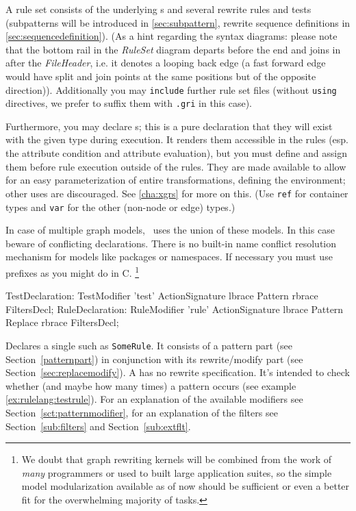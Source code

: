A rule set consists of the underlying s and several rewrite rules and tests (subpatterns will be introduced in \ref{sec:subpattern}, rewrite sequence definitions in \ref{sec:sequencedefinition}).
(As a hint regarding the syntax diagrams: please note that the bottom rail in the \emph{RuleSet} diagram departs before the end and joins in after the \emph{FileHeader}, i.e. it denotes a looping back edge (a fast forward edge would have split and join points at the same positions but of the opposite direction)).
Additionally you may \texttt{include} further rule set files (without \texttt{using} directives, we prefer to suffix them with \texttt{.gri} in this case).

Furthermore, you may declare s; this is a pure declaration that they will exist with the given type during execution. It renders them accessible in the rules (esp. the attribute condition and attribute evaluation), but you must define and assign them  before rule execution outside of the rules. They are made available to allow for an easy parameterization of entire transformations, defining the environment; other uses are discouraged. See \ref{cha:xgrs} for more on this.
(Use \texttt{ref} for container types and \texttt{var} for the other (non-node or edge) types.)

In case of multiple graph models, \GrG\ uses the union of these models. In this case beware of conflicting declarations.
There is no built-in name conflict resolution mechanism for models like packages or namespaces.
If necessary you must use prefixes as you might do in C.
\footnote{We doubt that graph rewriting kernels will be combined from the work of \emph{many} programmers or used to built large application suites, so the simple model modularization available as of now should be sufficient or even a better fit for the overwhelming majority of tasks.}

\begin{rail}
  TestDeclaration: TestModifier 'test' ActionSignature lbrace Pattern rbrace FiltersDecl;
  RuleDeclaration: RuleModifier 'rule' ActionSignature lbrace Pattern Replace rbrace FiltersDecl;
\end{rail}
Declares a single  such as \texttt{SomeRule}.
It consists of a pattern part (see Section~\ref{patternpart}) in conjunction with its rewrite/modify part (see Section~\ref{sec:replacemodify}).
A  has no rewrite specification.
It's intended to check whether (and maybe how many times) a pattern occurs (see example \ref{ex:rulelang:testrule}).
For an explanation of the available modifiers see Section~\ref{sct:patternmodifier},
for an explanation of the filters see Section~\ref{sub:filters} and Section~\ref{sub:extflt}.



